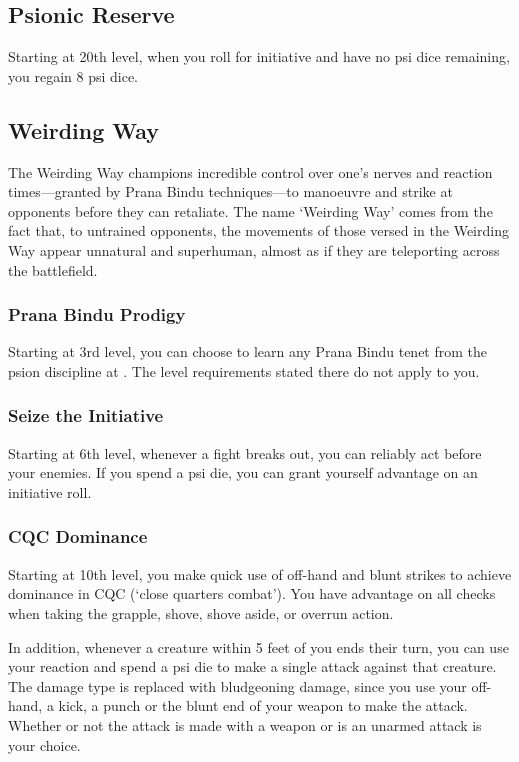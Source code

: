 \subsection{Psionic Reserve}
Starting at 20th level,
when you roll for initiative and have no psi dice remaining,
you regain 8 psi dice.

\subsection{Weirding Way}
The Weirding Way champions incredible control over one's nerves
and reaction times---granted by Prana Bindu techniques---to
manoeuvre and strike at opponents before they can retaliate.
The name `Weirding Way' comes from the fact that,
to untrained opponents, the movements of those versed in
the Weirding Way appear unnatural and superhuman,
almost as if they are teleporting across the battlefield.

\subsubsection{Prana Bindu Prodigy}
Starting at 3rd level,
you can choose to learn any Prana Bindu tenet from
the psion discipline at .
The level requirements stated there do not apply to you.

\subsubsection{Seize the Initiative}
Starting at 6th level,
whenever a fight breaks out,
you can reliably act before your enemies.
If you spend a psi die,
you can grant yourself advantage on an initiative roll.

\subsubsection{CQC Dominance}
Starting at 10th level,
you make quick use of off-hand and blunt strikes to
achieve dominance in CQC (`close quarters combat').
You have advantage on all checks when taking the
grapple, shove, shove aside, or overrun action.

In addition,
whenever a creature within 5 feet of you ends their turn,
you can use your reaction and spend a psi die
to make a single attack against that creature.
The damage type is replaced with bludgeoning damage,
since you use your off-hand,
a kick, a punch or the blunt end of your weapon
to make the attack.
Whether or not the attack is made with a weapon
or is an unarmed attack is your choice.

